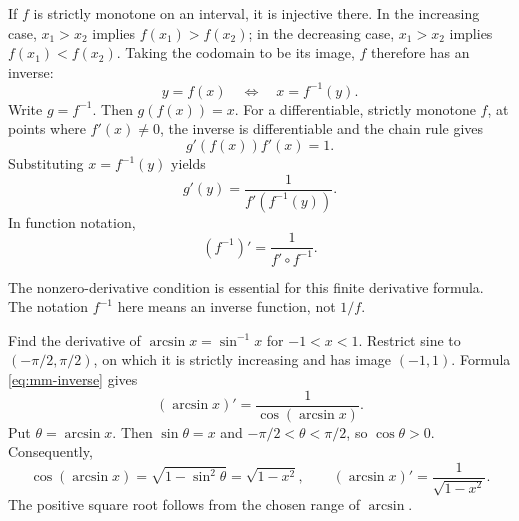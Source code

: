 If $f$ is strictly monotone on an interval, it is injective there. In the
increasing case, $x_1>x_2$ implies $f(x_1)>f(x_2)$; in the decreasing case,
$x_1>x_2$ implies $f(x_1)<f(x_2)$.
Taking the codomain to be its image, $f$ therefore has an inverse:
\[
 y=f(x)\quad\Longleftrightarrow\quad x=f^{-1}(y).
\]
Write $g=f^{-1}$. Then $g(f(x))=x$.
For a differentiable, strictly monotone $f$, at points where $f'(x)\ne0$,
the inverse is differentiable and the chain rule gives
\[
 g'(f(x))f'(x)=1.
\]
Substituting $x=f^{-1}(y)$ yields
\begin{equation}
 g'(y)=\frac{1}{f'(f^{-1}(y))}.
 \tag{2}\label{eq:mm-inverse}
\end{equation}
In function notation,
\begin{equation}
 (f^{-1})'=\frac{1}{f'\circ f^{-1}}.
 \tag{2'}
\end{equation}
\begin{remark}
The nonzero-derivative condition is essential for this finite derivative formula.
The notation $f^{-1}$ here means an inverse function, not $1/f$.
\end{remark}

\begin{example}
Find the derivative of $\arcsin x=\sin^{-1}x$ for $-1<x<1$.
Restrict sine to $(-\pi/2,\pi/2)$, on which it is strictly increasing and has
image $(-1,1)$. Formula \eqref{eq:mm-inverse} gives
\[
 (\arcsin x)'=\frac{1}{\cos(\arcsin x)}.
\]
Put $\theta=\arcsin x$. Then $\sin\theta=x$ and
$-\pi/2<\theta<\pi/2$, so $\cos\theta>0$. Consequently,
\[
 \cos(\arcsin x)=\sqrt{1-\sin^2\theta}=\sqrt{1-x^2},
 \qquad \boxed{(\arcsin x)'=\frac{1}{\sqrt{1-x^2}}}.
\]
The positive square root follows from the chosen range of $\arcsin$.
\end{example}

\begin{center}
\end{center}

